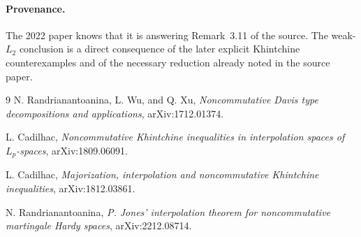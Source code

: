 \documentclass[11pt]{article}
\begin{document}
\paragraph{Provenance.}
The 2022 paper knows that it is answering Remark~3.11 of the source.  The
weak-\(L_2\) conclusion is a direct consequence of the later explicit
Khintchine counterexamples and of the necessary reduction already noted in
the source paper.

\begin{thebibliography}{9}
N. Randrianantoanina, L. Wu, and Q. Xu,
\emph{Noncommutative Davis type decompositions and applications},
arXiv:1712.01374.

L. Cadilhac,
\emph{Noncommutative Khintchine inequalities in interpolation spaces of
\(L_p\)-spaces}, arXiv:1809.06091.

L. Cadilhac,
\emph{Majorization, interpolation and noncommutative Khintchine
inequalities}, arXiv:1812.03861.

N. Randrianantoanina,
\emph{P. Jones' interpolation theorem for noncommutative martingale Hardy
spaces}, arXiv:2212.08714.
\end{thebibliography}
\end{document}

